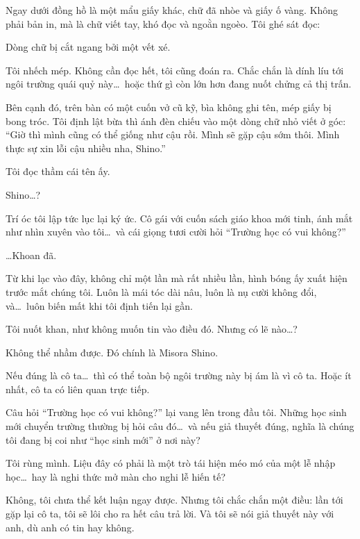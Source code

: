 \documentclass[../main.tex]{subfiles}
\begin{document}
Ngay dưới đồng hồ là một mẩu giấy khác, chữ đã nhòe và giấy ố vàng. Không phải bản in, mà là chữ viết tay, khó đọc và ngoằn ngoèo. Tôi ghé sát đọc:


Dòng chữ bị cắt ngang bởi một vết xé.

Tôi nhếch mép. Không cần đọc hết, tôi cũng đoán ra. Chắc chắn là dính líu tới ngôi trường quái quỷ này\dots\ hoặc thứ gì còn lớn hơn đang nuốt chửng cả thị trấn.

Bên cạnh đó, trên bàn có một cuốn vở cũ kỹ, bìa không ghi tên, mép giấy bị bong tróc. Tôi định lật bừa thì ánh đèn chiếu vào một dòng chữ nhỏ viết ở góc: ``Giờ thì mình cũng có thể giống như cậu rồi. Mình sẽ gặp cậu sớm thôi. Mình thực sự xin lỗi cậu nhiều nha, Shino.''

Tôi đọc thầm cái tên ấy.

Shino\dots?

Trí óc tôi lập tức lục lại ký ức. Cô gái với cuốn sách giáo khoa mới tinh, ánh mắt như nhìn xuyên vào tôi\dots\ và cái giọng tươi cười hỏi ``Trường học có vui không?''

\dots Khoan đã.

Từ khi lạc vào đây, không chỉ một lần mà rất nhiều lần, hình bóng ấy xuất hiện trước mắt chúng tôi. Luôn là mái tóc dài nâu, luôn là nụ cười không đổi, và\dots\ luôn biến mất khi tôi định tiến lại gần.

Tôi nuốt khan, như không muốn tin vào điều đó. Nhưng có lẽ nào\dots?

Không thể nhầm được. Đó chính là Misora Shino.

Nếu đúng là cô ta\dots\ thì có thể toàn bộ ngôi trường này bị ám là vì cô ta. Hoặc ít nhất, cô ta có liên quan trực tiếp.

Câu hỏi ``Trường học có vui không?'' lại vang lên trong đầu tôi. Những học sinh mới chuyển trường thường bị hỏi câu đó\dots\ và nếu giả thuyết đúng, nghĩa là chúng tôi đang bị coi như ``học sinh mới'' ở nơi này?

Tôi rùng mình. Liệu đây có phải là một trò tái hiện méo mó của một lễ nhập học\dots\ hay là nghi thức mở màn cho nghi lễ hiến tế?

Không, tôi chưa thể kết luận ngay được. Nhưng tôi chắc chắn một điều: lần tới gặp lại cô ta, tôi sẽ lôi cho ra hết câu trả lời. Và tôi sẽ nói giả thuyết này với anh, dù anh có tin hay không.
\end{document}
